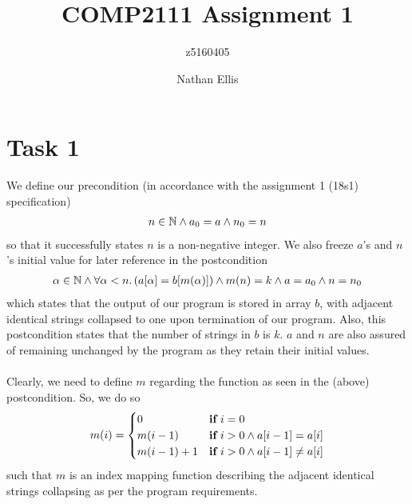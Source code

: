 \documentclass[a4paper,12pt,fleqn]{scrartcl}
\title{COMP2111 Assignment 1}
\author{z5160405 \and Nathan Ellis}
\begin{document}
\maketitle

\section{Task 1}
\label{sec:task-1}
We define our precondition (in accordance with the assignment 1 (18s1) specification)
\begin{gather*}
  n \in \mathbb{N} \wedge a_0 = a \wedge n_0 = n
\end{gather*}
so that it successfully states $n$ is a non-negative integer. We also freeze
$a$'s and $n$'s initial value for later reference in the postcondition
\begin{gather*}
  \alpha \in \mathbb{N} \wedge \forall \alpha <n.\left(a[\alpha] = b[m(\alpha)]\right) \wedge m(n)=k \wedge a=a_0 \wedge n=n_0
\end{gather*}
which states that the output of our program is stored in array $b$, with adjacent identical strings collapsed to one upon termination of our program. Also, this postcondition states that the number of strings in $b$ is $k$. $a$ and $n$ are also assured of remaining unchanged by the program as they retain their initial values.\\\\
Clearly, we need to define $m$ regarding the function as seen in the (above) postcondition. So, we do so
\[ m(i) = 
  \begin{cases}
    0 & \text{\normalfont\bfseries if}\ i=0\\
    m(i-1) & \text{\normalfont\bfseries if}\ i>0 \wedge a[i-1]=a[i]\\
    m(i-1)+1 & \text{\normalfont\bfseries if}\ i>0 \wedge a[i-1]\neq a[i]\\
  \end{cases}
\]
such that $m$ is an index mapping function describing the adjacent identical strings collapsing as per the program requirements.
\end{document}
